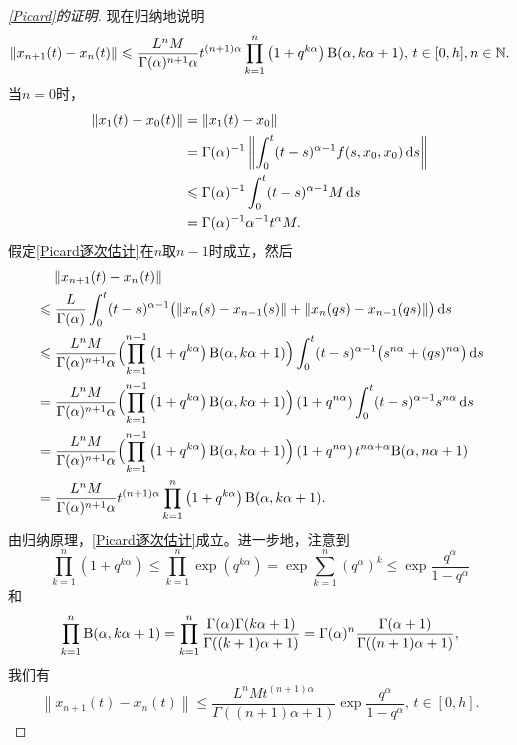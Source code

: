 \begin{proof}[\cref{Picard}的证明]
    现在归纳地说明
    \begin{equation}\label{Picard逐次估计}
        \left\| x_{n+1}(t) - x_n(t) \right\|\leqslant \frac{L^n M}{\Gamma(\alpha)^{n+1} \alpha} t^{(n+1)\alpha} \prod_{k=1}^n \left(1+q^{k\alpha}\right) \mathrm{B}(\alpha, k\alpha+1),\,t\in [0,h],n\in\mathbb{N}.
    \end{equation}
    当$n=0$时，
    \begin{align*}
        \left\| x_1(t)-x_0(t) \right\|&=\| x_1(t)-x_0 \|\\
        &=\Gamma(\alpha)^{-1}\left\| \int_0^t (t-s)^{\alpha-1} f(s,x_0,x_0)\mathop{}\!\mathrm{d} s\right\|\\
        &\leqslant \Gamma(\alpha)^{-1}\int_0^t (t-s)^{\alpha-1} M\mathop{}\!\mathrm{d} s\\
        &=\Gamma(\alpha)^{-1} \alpha^{-1} t^\alpha M.
    \end{align*}
    假定\cref{Picard逐次估计}在$n$取$n-1$时成立，然后
    \begin{align*}
        &\relphantom{\leqslant} \left\| x_{n+1}(t)-x_n(t) \right\| \\ &\leqslant \frac{L}{\Gamma(\alpha)}\int_0^t (t-s)^{\alpha-1} \bigl(\left\|x_n(s)-x_{n-1}(s)\right\| + \left\|x_n(qs)-x_{n-1}(qs)\right\|\bigr) \differential s\\
        &\leqslant \frac{L^{n} M}{\Gamma(\alpha)^{n+1} \alpha} \Bigl(\prod_{k=1}^{n-1}\left(1+q^{k\alpha}\right) \Beta(\alpha, k\alpha+1)\Bigr)\int_0^t (t-s)^{\alpha-1} \bigl(s^{n\alpha} + (qs)^{n\alpha}\bigr) \differential s\\
        &=\frac{L^{n} M}{\Gamma(\alpha)^{n+1} \alpha} \Bigl(\prod_{k=1}^{n-1}\left(1+q^{k\alpha}\right) \Beta(\alpha, k\alpha+1)\Bigr) \left(1+q^{n\alpha}\right) \int_0^t (t-s)^{\alpha-1} s^{n\alpha} \differential s\\
        &=\frac{L^{n} M}{\Gamma(\alpha)^{n+1} \alpha} \Bigl(\prod_{k=1}^{n-1}\left(1+q^{k\alpha}\right) \Beta(\alpha, k\alpha+1)\Bigr) \left(1+q^{n\alpha}\right) t^{n\alpha+\alpha}\Beta(\alpha, n\alpha+1)\\
        &=\frac{L^n M}{\Gamma(\alpha)^{n+1} \alpha} t^{(n+1)\alpha} \prod_{k=1}^n \left(1+q^{k\alpha}\right) \Beta(\alpha, k\alpha+1).
    \end{align*}
    由归纳原理，\cref{Picard逐次估计}成立。进一步地，注意到
    \begin{equation*}
        \prod_{k=1}^n \left(1+q^{k\alpha}\right)\leqslant \prod_{k=1}^n \exp\left(q^{k\alpha}\right)=\exp \sum_{k=1}^n \left(q^\alpha\right)^k\leqslant \exp \frac{q^\alpha}{1-q^\alpha}
    \end{equation*}
    和
    \begin{equation*}
        \prod_{k=1}^n \mathrm{B}(\alpha, k\alpha+1)=\prod_{k=1}^n \frac{\Gamma(\alpha) \Gamma(k\alpha+1)}{\Gamma((k+1)\alpha+1)}=\Gamma(\alpha)^n \frac{\Gamma(\alpha+1)}{\Gamma((n+1)\alpha+1)},
    \end{equation*}
    我们有
    \begin{equation*}
        \left\| x_{n+1}(t) - x_n(t) \right\|\leqslant \frac{L^n M t^{(n+1)\alpha}}{\Gamma((n+1)\alpha+1)} \exp \frac{q^\alpha}{1-q^\alpha},\,t\in [0,h].
    \end{equation*}


\end{proof}
